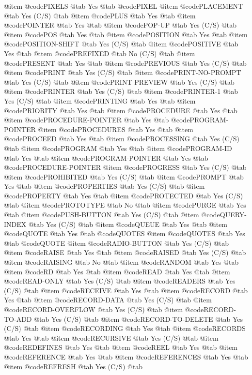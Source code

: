 @item @code{PIXELS} @tab Yes @tab @code{PIXEL}
@item @code{PLACEMENT} @tab Yes	(C/S) @tab 
@item @code{PLUS} @tab Yes @tab 
@item @code{POINTER} @tab Yes @tab 
@item @code{POP-UP} @tab Yes	(C/S) @tab 
@item @code{POS} @tab Yes @tab 
@item @code{POSITION} @tab Yes @tab 
@item @code{POSITION-SHIFT} @tab Yes	(C/S) @tab 
@item @code{POSITIVE} @tab Yes @tab 
@item @code{PREFIXED} @tab No	(C/S) @tab 
@item @code{PRESENT} @tab Yes @tab 
@item @code{PREVIOUS} @tab Yes	(C/S) @tab 
@item @code{PRINT} @tab Yes	(C/S) @tab 
@item @code{PRINT-NO-PROMPT} @tab Yes	(C/S) @tab 
@item @code{PRINT-PREVIEW} @tab Yes	(C/S) @tab 
@item @code{PRINTER} @tab Yes	(C/S) @tab 
@item @code{PRINTER-1} @tab Yes	(C/S) @tab 
@item @code{PRINTING} @tab Yes @tab 
@item @code{PRIORITY} @tab Yes @tab 
@item @code{PROCEDURE} @tab Yes @tab 
@item @code{PROCEDURE-POINTER} @tab Yes @tab @code{PROGRAM-POINTER}
@item @code{PROCEDURES} @tab Yes @tab 
@item @code{PROCEED} @tab Yes @tab 
@item @code{PROCESSING} @tab Yes	(C/S) @tab 
@item @code{PROGRAM} @tab Yes @tab 
@item @code{PROGRAM-ID} @tab Yes @tab 
@item @code{PROGRAM-POINTER} @tab Yes @tab @code{PROCEDURE-POINTER}
@item @code{PROGRESS} @tab Yes	(C/S) @tab 
@item @code{PROHIBITED} @tab Yes	(C/S) @tab 
@item @code{PROMPT} @tab Yes @tab 
@item @code{PROPERTIES} @tab Yes	(C/S) @tab 
@item @code{PROPERTY} @tab Yes @tab 
@item @code{PROTECTED} @tab Yes	(C/S) @tab 
@item @code{PROTOTYPE} @tab No @tab 
@item @code{PURGE} @tab Yes @tab 
@item @code{PUSH-BUTTON} @tab Yes	(C/S) @tab 
@item @code{QUERY-INDEX} @tab Yes	(C/S) @tab 
@item @code{QUEUE} @tab Yes @tab 
@item @code{QUOTE} @tab Yes @tab @code{QUOTES}
@item @code{QUOTES} @tab Yes @tab @code{QUOTE}
@item @code{RADIO-BUTTON} @tab Yes	(C/S) @tab 
@item @code{RAISE} @tab Yes @tab 
@item @code{RAISED} @tab Yes	(C/S) @tab 
@item @code{RAISING} @tab No @tab 
@item @code{RANDOM} @tab Yes @tab 
@item @code{RD} @tab Yes @tab 
@item @code{READ} @tab Yes @tab 
@item @code{READ-ONLY} @tab Yes	(C/S) @tab 
@item @code{READERS} @tab Yes	(C/S) @tab 
@item @code{RECEIVE} @tab Yes @tab 
@item @code{RECORD} @tab Yes @tab 
@item @code{RECORD-DATA} @tab Yes	(C/S) @tab 
@item @code{RECORD-OVERFLOW} @tab Yes	(C/S) @tab 
@item @code{RECORD-TO-ADD} @tab Yes	(C/S) @tab 
@item @code{RECORD-TO-DELETE} @tab Yes	(C/S) @tab 
@item @code{RECORDING} @tab Yes @tab 
@item @code{RECORDS} @tab Yes @tab 
@item @code{RECURSIVE} @tab Yes	(C/S) @tab 
@item @code{REDEFINES} @tab Yes @tab 
@item @code{REEL} @tab Yes @tab 
@item @code{REFERENCE} @tab Yes @tab 
@item @code{REFERENCES} @tab Yes @tab 
@item @code{REFRESH} @tab Yes	(C/S) @tab 
